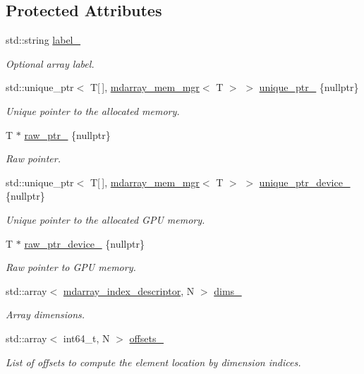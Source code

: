 \subsection*{Protected Attributes}
\begin{DoxyCompactItemize}
\item 
std\+::string \hyperlink{classsddk_1_1mdarray__base_ac901c98b22f5d42b0a1a57a097e43904}{label\+\_\+}
\begin{DoxyCompactList}\small\item\em Optional array label. \end{DoxyCompactList}\item 
std\+::unique\+\_\+ptr$<$ T\mbox{[}$\,$\mbox{]}, \hyperlink{structsddk_1_1mdarray__mem__mgr}{mdarray\+\_\+mem\+\_\+mgr}$<$ T $>$ $>$ \hyperlink{classsddk_1_1mdarray__base_aae4804447519c63f7c1c72d855744dc9}{unique\+\_\+ptr\+\_\+} \{nullptr\}
\begin{DoxyCompactList}\small\item\em Unique pointer to the allocated memory. \end{DoxyCompactList}\item 
T $\ast$ \hyperlink{classsddk_1_1mdarray__base_afd65549984a1e8b3b67c64a9c67f1aec}{raw\+\_\+ptr\+\_\+} \{nullptr\}
\begin{DoxyCompactList}\small\item\em Raw pointer. \end{DoxyCompactList}\item 
std\+::unique\+\_\+ptr$<$ T\mbox{[}$\,$\mbox{]}, \hyperlink{structsddk_1_1mdarray__mem__mgr}{mdarray\+\_\+mem\+\_\+mgr}$<$ T $>$ $>$ \hyperlink{classsddk_1_1mdarray__base_a956a63062c0919ace1afb44f6ed60e0c}{unique\+\_\+ptr\+\_\+device\+\_\+} \{nullptr\}
\begin{DoxyCompactList}\small\item\em Unique pointer to the allocated G\+P\+U memory. \end{DoxyCompactList}\item 
T $\ast$ \hyperlink{classsddk_1_1mdarray__base_a550cb86fe97cca94a263040970cdd8f4}{raw\+\_\+ptr\+\_\+device\+\_\+} \{nullptr\}
\begin{DoxyCompactList}\small\item\em Raw pointer to G\+P\+U memory. \end{DoxyCompactList}\item 
std\+::array$<$ \hyperlink{classsddk_1_1mdarray__index__descriptor}{mdarray\+\_\+index\+\_\+descriptor}, N $>$ \hyperlink{classsddk_1_1mdarray__base_a06385cbaf87e14e02057f844e9acc3de}{dims\+\_\+}
\begin{DoxyCompactList}\small\item\em Array dimensions. \end{DoxyCompactList}\item 
std\+::array$<$ int64\+\_\+t, N $>$ \hyperlink{classsddk_1_1mdarray__base_a7ad3a05f61945373d526ce2c33438b32}{offsets\+\_\+}
\begin{DoxyCompactList}\small\item\em List of offsets to compute the element location by dimension indices. \end{DoxyCompactList}\end{DoxyCompactItemize}
